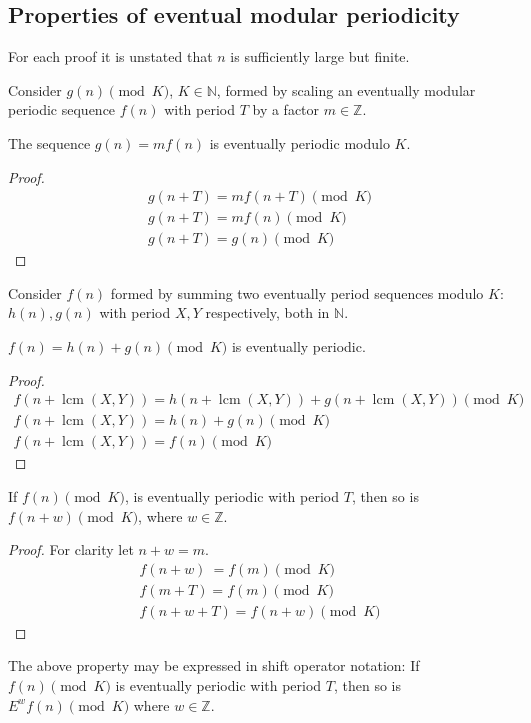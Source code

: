 \documentclass[12pt,reqno]{article}
\DeclareMathOperator{\lcm}{lcm}
\begin{document}
\begin{appendix}
	\section{Properties of eventual modular periodicity}\label{app:app}
	For each proof it is unstated that $n$ is sufficiently large but finite.

	Consider $g(n) \pmod {K}$, $K \in \mathbb{N}$, formed by scaling an eventually modular periodic sequence $f(n)$ with period $T$ by a factor $m \in \mathbb{Z}$.
	\begin{proposition}

		The sequence $g(n) = mf(n)$ is eventually periodic modulo $K$.
		\begin{proof}

			\begin{align}
				g(n +T) =m f(n + T)\pmod {K} \\
				g(n +T) = m f(n)\pmod {K}    \\
				g(n +T)	= g(n)\pmod {K}
			\end{align}

		\end{proof}

	\end{proposition}
	Consider $f(n)$ formed by summing two eventually period sequences modulo $K$: $h(n), g(n)$ with period $X,Y$ respectively, both in $\mathbb{N}$.
	\begin{proposition}
		$f(n) = h(n) + g(n) \pmod {K}$ is eventually periodic.
		\begin{proof}
			\begin{align}
				f(n + \lcm(X,Y)) = h(n + \lcm(X,Y)) + g(n + \lcm(X,Y))\pmod {K} \\
				f(n + \lcm(X,Y)) = h(n) + g(n) \pmod {K}                        \\
				f(n + \lcm(X,Y))= f(n)\pmod {K}
			\end{align}
		\end{proof}

	\end{proposition}
	\begin{proposition}
		If $f(n) \pmod {K}$, is eventually periodic with period $T$, then so is $f(n + w)\pmod {K}$, where $w \in \mathbb{Z}$.

		\begin{proof}
			For clarity let $n + w = m$.
			\begin{align}
				f(n + w) ~{}  = f(m)\pmod {K} \\
				f(m + T) = f(m) \pmod {K}     \\
				f(n + w + T) = f(n + w) \pmod {K}
			\end{align}

		\end{proof}
		The above property may be expressed in shift operator notation:
		If $f(n) \pmod {K} $ is eventually periodic with period $T$, then so is $E^{w}f(n) \pmod {K}$ where $w \in \mathbb{Z}$.
	\end{proposition}

\end{appendix}
\end{document}
